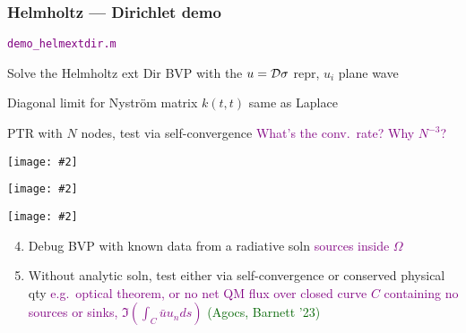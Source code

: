 \documentclass[t]{beamer}
\newcommand{\ft}[1]{\frametitle{#1}}
\newcommand{\ben}{\begin{enumerate}}
\newcommand{\een}{\end{enumerate}}
\newcommand{\who}[1]{{\scriptsize \textcolor{darkgreen}{(#1)}}}  %
\newcommand{\com}[1]{{\scriptsize \textcolor{purple}{#1}}}      %
\newcommand{\sg}{\vspace{1ex}}
\newcommand{\bmp}[1]{\begin{minipage}{#1}}
\newcommand{\emp}{\end{minipage}}
\newcommand{\pig}[2]{\bmp{#1}\texttt{[image: \#2]}\emp} %
\newcommand{\Drep}{{\cal D}}
\begin{document}
\begin{frame}\ft{Helmholtz --- Dirichlet demo}
\vspace{-5ex}
\hfill\com{{\tt demo\_helmextdir.m}}

    \vspace{5ex}
    Solve the Helmholtz ext Dir BVP with the $u = \Drep \sigma$ repr, $u_i$ plane wave
    \sg 

    Diagonal limit for Nystr\"{o}m matrix $k(t, t)$ same as Laplace
    \sg 

    PTR with $N$ nodes, test via self-convergence \com{What's the conv.\ rate?} \com{ Why $N^{-3}$?}

\sg

\pause
\vspace{5pt}
\pig{1.4in}{helmextdir}
\hfill
\pig{1.3in}{helmextdir_conv}
\hfill
\pause
\pig{1.3in}{helmextdir_err}

  
  \ben
\setcounter{enumi}{3}
  \item Debug BVP with known data from a radiative soln \com{sources inside $\Omega$}
  \item Without analytic soln, test either via self-convergence or conserved physical qty \com{e.g.\ optical theorem, or no net QM flux over closed curve $C$ containing no sources or sinks, $\Im\left( \int_{C} \bar{u}u_n ds \right)$ \who{Agocs, Barnett '23}}
\een


\end{frame}
\end{document}

